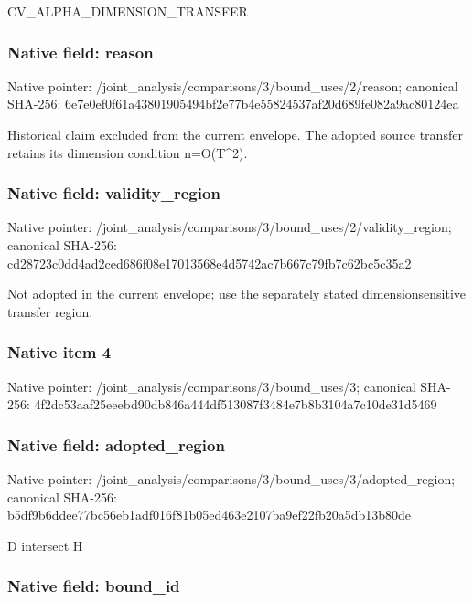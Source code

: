 \documentclass[10pt,a4paper]{article}
\begin{document}
CV\_ALPHA\_DIMENSION\_TRANSFER


\subsubsection{Native field: reason}


Native pointer: /joint\_analysis/comparis\allowbreak{}ons/3/bound\_uses/2/reaso\allowbreak{}n; canonical SHA-256: 6e7e0ef0f61a43801905494b\allowbreak{}f2e77b4e55824537af20d689\allowbreak{}fe082a9ac80124ea


Historical claim excluded from the current envelope. The adopted source transfer retains its dimension condition n=O(T\textasciicircum{}2).


\subsubsection{Native field: validity\_region}


Native pointer: /joint\_analysis/comparis\allowbreak{}ons/3/bound\_uses/2/valid\allowbreak{}ity\_region; canonical SHA-256: cd28723c0dd4ad2ced686f08\allowbreak{}e17013568e4d5742ac7b667c\allowbreak{}79fb7c62bc5c35a2


Not adopted in the current envelope; use the separately stated dimensionsensitive transfer region.


\subsubsection{Native item 4}


Native pointer: /joint\_analysis/comparis\allowbreak{}ons/3/bound\_uses/3; canonical SHA-256: 4f2dc53aaf25eeebd90db846\allowbreak{}a444df513087f3484e7b8b31\allowbreak{}04a7c10de31d5469



\subsubsection{Native field: adopted\_region}


Native pointer: /joint\_analysis/comparis\allowbreak{}ons/3/bound\_uses/3/adopt\allowbreak{}ed\_region; canonical SHA-256: b5df9b6ddee77bc56eb1adf0\allowbreak{}16f81b05ed463e2107ba9ef2\allowbreak{}2fb20a5db13b80de


D intersect H


\subsubsection{Native field: bound\_id}
\end{document}
